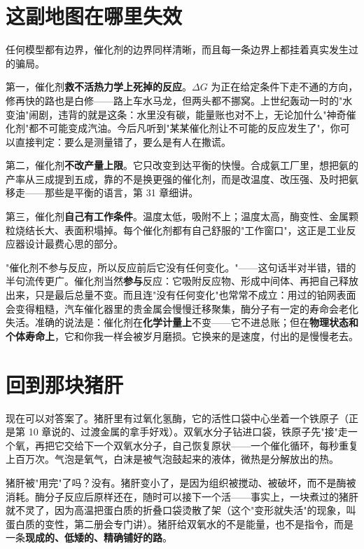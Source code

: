\section{这副地图在哪里失效}

任何模型都有边界，催化剂的边界同样清晰，而且每一条边界上都挂着真实发生过的骗局。

第一，催化剂\textbf{救不活热力学上死掉的反应}。$\Delta G$ 为正在给定条件下走不通的方向，修再快的路也是白修——路上车水马龙，但两头都不挪窝。上世纪轰动一时的"水变油"闹剧，违背的就是这条：水里没有碳，能量账也对不上，无论加什么"神奇催化剂"都不可能变成汽油。今后凡听到"某某催化剂让不可能的反应发生了"，你可以直接判定：要么是测量错了，要么是有人在撒谎。

第二，催化剂\textbf{不改产量上限}。它只改变到达平衡的快慢。合成氨工厂里，想把氨的产率从三成提到五成，靠的不是换更强的催化剂，而是改温度、改压强、及时把氨移走——那些是平衡的语言，第 31 章细讲。

第三，催化剂\textbf{自己有工作条件}。温度太低，吸附不上；温度太高，酶变性、金属颗粒烧结长大、表面积塌掉。每个催化剂都有自己舒服的"工作窗口"，这正是工业反应器设计最费心思的部分。

\begin{wuqu}
"催化剂不参与反应，所以反应前后它没有任何变化。"——这句话半对半错，错的半句流传更广。催化剂当然\textbf{参与}反应：它吸附反应物、形成中间体、再把自己释放出来，只是最后总量不变。而且连"没有任何变化"也常常不成立：用过的铂网表面会变得粗糙，汽车催化器里的贵金属会慢慢迁移聚集，酶分子有一定的寿命会老化失活。准确的说法是：催化剂在\textbf{化学计量上}不变——它不进总账；但在\textbf{物理状态和个体寿命上}，它和你我一样会被岁月磨损。它换来的是速度，付出的是慢慢老去。
\end{wuqu}

\section{回到那块猪肝}

现在可以对答案了。猪肝里有过氧化氢酶，它的活性口袋中心坐着一个铁原子（正是第 10 章说的、过渡金属的拿手好戏）。双氧水分子钻进口袋，铁原子先"接"走一个氧，再把它交给下一个双氧水分子，自己恢复原状——一个催化循环，每秒重复上百万次。气泡是氧气，白沫是被气泡鼓起来的液体，微热是分解放出的热。

猪肝被"用完"了吗？没有。猪肝变小了，是因为组织被搅动、被破坏，而不是酶被消耗。酶分子反应后原样还在，随时可以接下一个活——事实上，一块煮过的猪肝就不灵了，因为高温把蛋白质的折叠口袋烫散了架（这个"变形就失活"的现象，叫蛋白质的变性，第二册会专门讲）。猪肝给双氧水的不是能量，也不是指令，而是一条\textbf{现成的、低矮的、精确铺好的路}。

